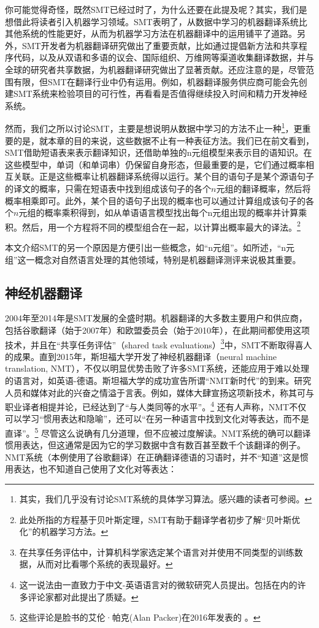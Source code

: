 \documentclass[output=paper]{langscibook}
\begin{document}
你可能觉得奇怪，既然SMT已经过时了，为什么还要在此提及呢？其实，我们是想借此将读者引入机器学习领域。SMT表明了，从数据中学习的机器翻译系统比其他系统的性能更好，从而为机器学习方法在机器翻译中的运用铺平了道路。另外，SMT开发者为机器翻译研究做出了重要贡献，比如通过提倡新方法和共享程序代码，以及从双语和多语的议会、国际组织、万维网等渠道收集翻译数据，并与全球的研究者共享数据，为机器翻译研究做出了显著贡献。还应注意的是，尽管范围有限，但SMT在翻译行业中仍有运用。例如，机器翻译服务供应商可能会先创建SMT系统来检验项目的可行性，再看看是否值得继续投入时间和精力开发神经系统。

然而，我们之所以讨论SMT，主要是想说明从数据中学习的方法不止一种\footnote{其实，我们几乎没有讨论SMT系统的具体学习算法。感兴趣的读者可参阅\citet{Koehn2010}。}，更重要的是，就本章的目的来说，这些数据不止有一种表征方法。我们已在前文看到，SMT借助短语表来表示翻译知识，还借助单独的n元组模型来表示目的语知识。在这些模型中，单词（和单词串）仍保留自身形态，但最重要的是，它们通过概率相互关联。正是这些概率让机器翻译系统得以运行。某个目的语句子是某个源语句子的译文的概率，只需在短语表中找到组成该句子的各个$n$元组的翻译概率，然后将概率相乘即可。此外，某个目的语句子出现的概率也可以通过计算组成该句子的各个$n$元组的概率乘积得到，如从单语语言模型找出每个n元组出现的概率并计算乘积。然后，用一个方程将不同的模型组合在一起，以计算出概率最大的译法。\footnote{此处所指的方程基于贝叶斯定理，SMT有助于翻译学者初步了解“贝叶斯优化”的机器学习方法。}

本文介绍SMT的另一个原因是方便引出一些概念，如“n元组”。如所述，“n元组”这一概念对自然语言处理的其他领域，特别是机器翻译测评来说极其重要。


\subsection{神经机器翻译}
2004年至2014年是SMT发展的全盛时期。机器翻译的大多数主要用户和供应商，包括谷歌翻译（始于2007年）和欧盟委员会（始于2010年），在此期间都使用这项技术，并且在“共享任务评估”（shared task
evaluations）\footnote{在共享任务评估中，计算机科学家选定某个语言对并使用不同类型的训练数据，从而对比看哪个系统的表现最好。}中，SMT不断取得喜人的成果。直到2015年，斯坦福大学开发了神经机器翻译（neural machine translation, NMT），不仅以明显优势击败了许多SMT系统，还能应用于难以处理的语言对，如英语-德语\citep{Bentivogli2016}。斯坦福大学的成功宣告\citet{Bentivogli2016}所谓“NMT新时代”的到来。研究人员和媒体对此的兴奋之情溢于言表。例如，媒体大肆宣扬这项新技术，称其可与职业译者相提并论，已经达到了“与人类同等的水平”。\footnote{这一说法由一直致力于中文-英语语言对的微软研究人员提出\citep{Marking2016}。包括\citet{Toral-etal-2018}在内的许多评论家都对此提出了质疑。} 还有人声称，NMT不仅可以学习“惯用表达和隐喻”，还可以“在另一种语言中找到文化对等表达，而不是直译”\citep{Marking2016}。\footnote{这些评论是脸书的艾伦·帕克(Alan Packer)在2016年发表的 \citep{Marking2016}。} 尽管这么说确有几分道理，但不应被过度解读。NMT系统的确可以翻译惯用表达，但这通常是因为它的学习数据中含有数百甚至数千个该翻译的例子。NMT系统（本例使用了谷歌翻译）在正确翻译德语的习语时，并不“知道”这是惯用表达，也不知道自己使用了文化对等表达：
\end{document}
